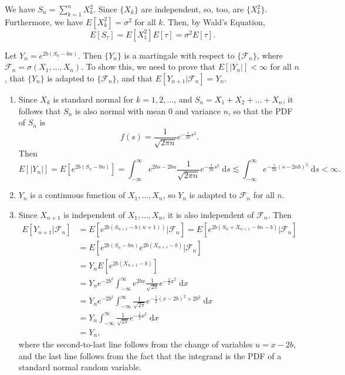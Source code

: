 \documentclass{homework}
\newcommand{\fil}{\mathcal{F}}
\begin{document}
	We have $S_n = \sum\limits_{k=1}^nX_k^2$. Since $\{X_k\}$ are independent, so, too, are $\{X_k^2\}$. Furthermore, we have $E[X_k^2] = \sigma^2$ for all $k$. Then, by Wald's Equation,
	\begin{equation*}
		E[S_\tau] = E[X_1^2]E[\tau] = \sigma^2E[\tau].
	\end{equation*}
	
	\question Let $Y_n = e^{2b(S_n-bn)}$. Then $\{Y_n\}$ is a martingale with respect to $\{\fil_n\}$, where $\fil_n = \sigma(X_1,\dots,X_n)$. To show this, we need to prove that $E[|Y_n|] < \infty$ for all $n$, that $\{Y_n\}$ is adapted to $\{\fil_n\}$, and that $E[Y_{n+1}|\fil_n] = Y_n$.
	\begin{enumerate}
		\item Since $X_k$ is standard normal for $k=1,2,\dots$, and $S_n = X_1+X_2+\dots + X_n$, it follows that $S_n$ is also normal with mean 0 and variance $n$, so that the PDF of $S_n$ is
		\begin{equation*}
			f(s) = \frac{1}{\sqrt{2\pi n}}e^{-\frac{1}{2n}s^2}.
		\end{equation*}
		Then
		\begin{equation*}
			E[|Y_n|] = E\left[e^{2b(S_n - bn)}\right] = \int_{-\infty}^\infty e^{2bs - 2bn} \frac{1}{\sqrt{2\pi n}}e^{-\frac{1}{2n}s^2}\;\text{d}s \lesssim \int_{-\infty}^\infty e^{-\frac{1}{2n}(s - 2nb)^2}\;\text{d}s < \infty.
		\end{equation*}
		\item $Y_n$ is a continuous function of $X_1,\dots,X_n$, so $Y_n$ is adapted to $\fil_n$ for all $n$.
		\item Since $X_{n+1}$ is independent of $X_1,\dots, X_n$, it is also independent of $\fil_n$. Then
		\begin{align*}
			E[Y_{n+1}\big|\fil_n] &= E\left[e^{2b(S_{n+1} - b(n+1))}\big|\fil_n\right] = E\left[e^{2b(S_n + X_{n+1} - bn - b)}|\fil_n\right] \\[0.5em]
			&= E\left[e^{2b(S_n-bn)}e^{2b(X_{n+1} -b)}\big|\fil_n\right] \\
			&= Y_nE\left[e^{2b(X_{n+1}-b)}\right] \\
			&= Y_n e^{-2b^2}\int_{-\infty}^\infty e^{2bx}\frac{1}{\sqrt{2\pi}}e^{-\frac{1}{2}x^2}\;\text{d}x \\
			&= Y_n e^{-2b^2}\int_{-\infty}^\infty\frac{1}{\sqrt{2\pi}}e^{-\frac{1}{2}(x-2b)^2+2b^2}\;\text{d}x \\
			&= Y_n\int_{-\infty}^\infty \frac{1}{\sqrt{2\pi}}e^{-\frac{1}{2}x^2}\;\text{d}x \\
			&= Y_n,
		\end{align*}
		where the second-to-last line follows from the change of variables $u = x-2b$, and the last line follows from the fact that the integrand is the PDF of a standard normal random variable.
	\end{enumerate}
	
\end{document}
